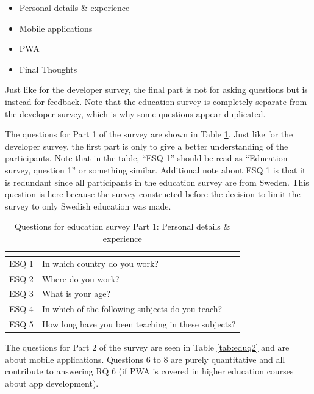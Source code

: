 \documentclass[a4paper,12pt]{article}
\begin{document}
\begin{itemize}
    \item Personal details \& experience
    \item Mobile applications
    \item PWA
    \item Final Thoughts
\end{itemize}

Just like for the developer survey, the final part is not for asking questions but is instead for feedback. Note that the education survey is completely separate from the developer survey, which is why some questions appear duplicated.

The questions for Part 1 of the survey are shown in Table \ref{tab:eduq1}. Just like for the developer survey, the first part is only to give a better understanding of the participants. Note that in the table, “ESQ 1” should be read as “Education survey, question 1” or something similar. Additional note about ESQ 1 is that it is redundant since all participants in the education survey are from Sweden. This question is here because the survey constructed before the decision to limit the survey to only Swedish education was made.

\begin{table}[ht]
\centering
{}
\begin{tabular}{|l|l|}
\hline
\rowcolor[HTML]{656565}
\multicolumn{1}{|c|}{\cellcolor[HTML]{656565}{\color[HTML]{FFFFFF} Number}} & \multicolumn{1}{l|}{\cellcolor[HTML]{656565}{\color[HTML]{FFFFFF} Question}} \\ \hline
ESQ 1 & In which country do you work? \\
ESQ 2 & Where do you work? \\
ESQ 3 & What is your age? \\
ESQ 4 & In which of the following subjects do you teach? \\
ESQ 5 & How long have you been teaching in these subjects? \\
\hline
\end{tabular}
\caption{Questions for education survey Part 1: Personal details \& experience}
\label{tab:eduq1}
\end{table}

The questions for Part 2 of the survey are seen in Table \ref{tab:eduq2} and are about mobile applications. Questions 6 to 8 are purely quantitative and all contribute to answering RQ 6 (if PWA is covered in higher education courses about app development).
\end{document}
